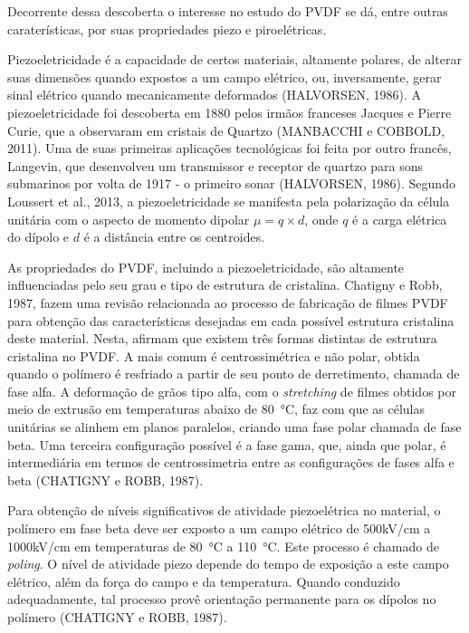 \documentclass[
	12pt,				
	oneside,			
	a4paper,			
	english,			
	brazil,	
	sumario=abnt-6027-2012		
	]{abntex2ppgsi}
\begin{document}
Decorrente dessa descoberta o interesse no estudo do PVDF se dá, entre outras caraterísticas, por suas propriedades piezo e piroelétricas. 

Piezoeletricidade é a capacidade de certos materiais, altamente polares, de alterar suas dimensões quando expostos a um campo elétrico, ou, inversamente, gerar sinal elétrico quando mecanicamente deformados (HALVORSEN, 1986). A piezoeletricidade foi descoberta em 1880 pelos irmãos franceses Jacques e Pierre Curie, que a observaram em cristais de Quartzo (MANBACCHI e COBBOLD, 2011). Uma de suas primeiras aplicações tecnológicas foi feita por outro francês, Langevin, que desenvolveu um transmissor e receptor de quartzo para sons submarinos por volta de 1917 - o primeiro sonar (HALVORSEN, 1986). Segundo Loussert et al., 2013, a piezoeletricidade se manifesta pela polarização da célula unitária com o aspecto de momento dipolar $\mu = q\times d$, onde $q$ é a carga elétrica do dípolo e $d$ é a distância entre os centroides.  

As propriedades do PVDF, incluindo a piezoeletricidade, são altamente influenciadas pelo seu grau e tipo de estrutura de cristalina. Chatigny e Robb, 1987, fazem uma revisão relacionada ao processo de fabricação de filmes PVDF para obtenção das características desejadas em cada possível estrutura cristalina deste material. Nesta, afirmam que existem três formas distintas de estrutura cristalina no PVDF. A mais comum é centrossimétrica e não polar, obtida quando o polímero é resfriado a partir de seu ponto de derretimento, chamada de fase alfa. A deformação de grãos tipo alfa, com o \textit{stretching} de filmes obtidos por meio de extrusão em temperaturas abaixo de \SI{80}{\celsius}, faz com que as células unitárias se alinhem em planos paralelos, criando uma fase polar chamada de fase beta. Uma terceira configuração possível é a fase gama, que, ainda que polar, é intermediária em termos de centrossimetria entre as configurações de fases alfa e beta (CHATIGNY e ROBB, 1987).

Para obtenção de níveis significativos de atividade piezoelétrica no material, o polímero em fase beta deve ser exposto a um campo elétrico de 500kV/cm a 1000kV/cm em temperaturas de \SI{80}{\celsius} a \SI{110}{\celsius}. Este processo é chamado de \textit{poling}. O nível de atividade piezo depende do tempo de exposição a este campo elétrico, além da força do campo e da temperatura. Quando conduzido adequadamente, tal processo provê orientação permanente para os dípolos no polímero (CHATIGNY e ROBB, 1987). 
\end{document}
